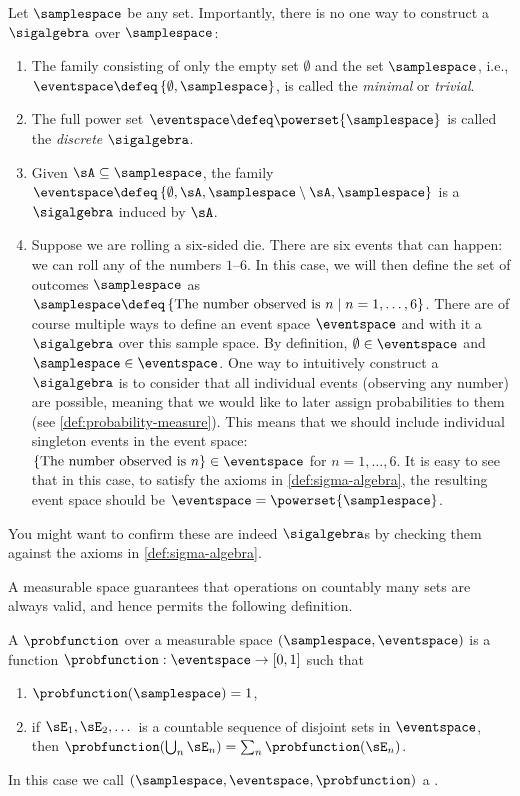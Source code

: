 \begin{example}[$\sigalgebra$s]
Let $\samplespace$ be any set. 
Importantly, there is no one way to construct a $\sigalgebra$ over $\samplespace$:
\begin{enumerate}
    \item The family consisting of only the empty set $\emptyset$ and the set $\samplespace$, i.e., $\eventspace\defeq \left\{\emptyset, \samplespace\right\}$, is called the \emph{minimal} or \emph{trivial}.
    \item The full power set $\eventspace \defeq \powerset{\samplespace}$ is called the \emph{discrete $\sigalgebra$}.
    \item Given $\sA \subseteq \samplespace$, the family $\eventspace \defeq \left\{\emptyset, \sA, \samplespace \setminus \sA, \samplespace \right\}$ is a $\sigalgebra$ induced by $\sA$.
    \item Suppose we are rolling a six-sided die. 
    There are six events that can happen: we can roll any of the numbers $1\text{--}6$.
    In this case, we will then define the set of outcomes $\samplespace$ as $\samplespace \defeq \left\{\text{The number observed is } n \mid n = 1, \ldots, 6\right\}$.
    There are of course multiple ways to define an event space $\eventspace$ and with it a $\sigalgebra$ over this sample space.
    By definition, $\emptyset \in \eventspace$ and $\samplespace \in \eventspace$.
    One way to intuitively construct a $\sigalgebra$ is to consider that all individual events (observing any number) are possible, meaning that we would like to later assign probabilities to them (see \cref{def:probability-measure}). 
    This means that we should include individual singleton events in the event space: $\left\{\text{The number observed is } n \right\} \in \eventspace$ for $n =1, \ldots, 6$.
    It is easy to see that in this case, to satisfy the axioms in \cref{def:sigma-algebra}, the resulting event space should be $\eventspace = \powerset{\samplespace}$. 
\end{enumerate}
You might want to confirm these are indeed $\sigalgebra$s by checking them against the axioms in \cref{def:sigma-algebra}.
\end{example}
A measurable space guarantees that operations on countably many sets are always valid, and hence permits the following definition.
\begin{definition}
\label{def:probability-measure}
A  $\probfunction$ over a measurable space $(\samplespace,\eventspace)$ is a function $\probfunction:\eventspace\to[0,1]$ such that
\begin{enumerate}[label=\arabic*)]
    \item $\probfunction(\samplespace)=1$,
    \item if $\sE_1,\sE_2,\dots$ is a countable sequence of disjoint sets in $\eventspace$, then $\probfunction(\bigcup_n \sE_n)=\sum_n \probfunction(\sE_n)$.
\end{enumerate}
In this case we call $(\samplespace,\eventspace, \probfunction)$ a .
\end{definition}

